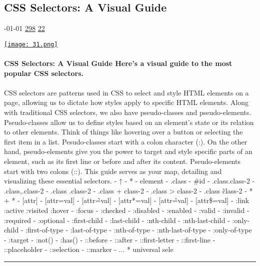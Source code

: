 \documentclass[10pt,a4paper]{article}
\begin{document}
\begin{multicols*}{2}

\noindent\begin{minipage}{\linewidth}
\subsection{CSS Selectors: A Visual Guide}
\textsc{\footnotesize
{\scriptsize\faCalendar}-01-01 
{\scriptsize\faThumbsOUp}\space 
\href{http://news.ycombinator.com/item?id=37132754\&utm\_term=comment}{298} 
{\scriptsize\faComments}\space 
\href{http://news.ycombinator.com/item?id=37132754\&utm\_term=comment}{22} 
}
\par\medskip\noindent
\href{https://fffuel.co/css-selectors/?utm\_source=hackernewsletter\&utm\_medium=email\&utm\_term=design}{
    \texttt{[image: 31.png]}
}
\end{minipage}
\paragraph{}
\textbf{CSS Selectors: A Visual Guide
 Here's a visual guide to the most popular CSS selectors.}
\paragraph{}

CSS selectors are patterns used in CSS to select and style HTML elements on a page, allowing us to dictate how styles apply to specific HTML elements.
Along with traditional CSS selectors, we also have pseudo-classes and pseudo-elements. Pseudo-classes allow us to define styles based on an element's state or its relation to other elements. Think of things like hovering over a button or selecting the first item in a list. Pesudo-classes start with a colon character (:).
On the other hand, pseudo-elements give you the power to target and style specific parts of an element, such as its first line or before and after its content. Pseudo-elements start with two colons (::).
This guide serves as your map, detailing and visualizing these essential selectors.
- ↑
- *
- element
- .class
- \#id
- .class.class-2
- .class,.class-2
- .class .class-2
- .class + class-2
- .class > class-2
- .class \~ class-2
- * + *
- [attr]
- [attr=val]
- [attr\~=val]
- [attr*=val]
- [attr\^=val]
- [attr\$=val]
- :link :active :visited :hover
- :focus
- :checked
- :disabled
- :enabled
- :valid
- :invalid
- :required
- :optional
- :first-child
- :last-child
- :nth-child
- :nth-last-child
- :only-child
- :first-of-type
- :last-of-type
- :nth-of-type
- :nth-last-of-type
- :only-of-type
- :target
- :not()
- :has()
- ::before
- ::after
- ::first-letter
- ::first-line
- ::placeholder
- ::selection
- ::marker
- ...
* universal sele
\par\noindent\textcolor{red}{\rule{\linewidth}{0.2mm}}
\vfill
\null
\noindent\begin{minipage}{\linewidth}

\end{minipage}
\end{multicols*}
\end{document}
